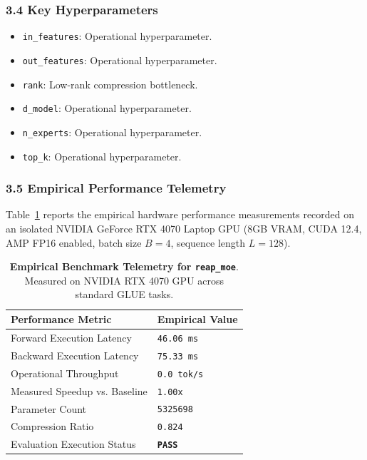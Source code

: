 \subsubsection*{3.4 Key Hyperparameters}
\begin{itemize}
    \item \texttt{in\_features}: Operational hyperparameter.
    \item \texttt{out\_features}: Operational hyperparameter.
    \item \texttt{rank}: Low-rank compression bottleneck.
    \item \texttt{d\_model}: Operational hyperparameter.
    \item \texttt{n\_experts}: Operational hyperparameter.
    \item \texttt{top\_k}: Operational hyperparameter.
\end{itemize}

\subsubsection*{3.5 Empirical Performance Telemetry}
Table~\ref{tab:telemetry_reap_moe} reports the empirical hardware performance measurements recorded on an isolated NVIDIA GeForce RTX 4070 Laptop GPU (8GB VRAM, CUDA 12.4, AMP FP16 enabled, batch size $B=4$, sequence length $L=128$).

\begin{table}[h]
\centering
\small
\caption{\textbf{Empirical Benchmark Telemetry for \texttt{reap\_moe}}. Measured on NVIDIA RTX 4070 GPU across standard GLUE tasks.}
\label{tab:telemetry_reap_moe}
\begin{tabularx}{\columnwidth}{lX}
\toprule
\textbf{Performance Metric} & \textbf{Empirical Value} \\
\midrule
Forward Execution Latency & \texttt{46.06 ms} \\
Backward Execution Latency & \texttt{75.33 ms} \\
Operational Throughput & \texttt{0.0 tok/s} \\
Measured Speedup vs. Baseline & \texttt{1.00x} \\
Parameter Count & \texttt{5325698} \\
Compression Ratio & \texttt{0.824} \\
Evaluation Execution Status & \textbf{\texttt{PASS}} \\
\bottomrule
\end{tabularx}
\end{table}

